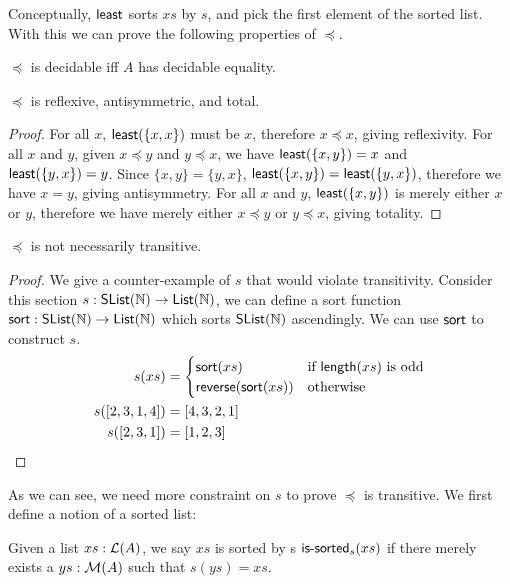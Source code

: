 Conceptually, $\operatorname{\mathsf{least}}$ sorts $xs$ by $s$, and pick the first element of the sorted list.
With this we can prove the following properties of $\preccurlyeq$.

\begin{proposition}
    $\preccurlyeq$ is decidable iff $A$ has decidable equality.
\end{proposition}

\begin{proposition}
$\preccurlyeq$ is reflexive, antisymmetric, and total.
\end{proposition}
\begin{proof}
For all $x$, $\operatorname{\mathsf{least}}(\{x, x\})$ must be $x$, therefore $x \preccurlyeq x$, giving reflexivity.
For all $x$ and $y$, given $x \preccurlyeq y$ and $y \preccurlyeq x$,
we have $\operatorname{\mathsf{least}}(\{x, y\}) = x$ and $\operatorname{\mathsf{least}}(\{y, x\}) = y$.
Since $\{x, y\} = \{y, x\}$, $\operatorname{\mathsf{least}}(\{x, y\}) = \operatorname{\mathsf{least}}(\{y, x\})$,
therefore we have $x = y$, giving antisymmetry.
For all $x$ and $y$, $\operatorname{\mathsf{least}}(\{x, y\})$ is merely either $x$ or $y$,
therefore we have merely either $x \preccurlyeq y$ or $y \preccurlyeq x$, giving totality.
\end{proof}

\begin{proposition}
$\preccurlyeq$ is not necessarily transitive.
\end{proposition}
\begin{proof}
We give a counter-example of $s$ that would violate transitivity.
Consider this section $s : \operatorname{\mathsf{SList}}(\mathbb{N}) \to \operatorname{\mathsf{List}}(\mathbb{N})$, we can define a sort function
$\operatorname{\mathsf{sort}} : \operatorname{\mathsf{SList}}(\mathbb{N}) \to \operatorname{\mathsf{List}}(\mathbb{N})$ which sorts $\operatorname{\mathsf{SList}}(\mathbb{N})$ ascendingly. We can use $\operatorname{\mathsf{sort}}$
to construct $s$.
\begin{align*}
    s(xs) &= \begin{cases}
        \operatorname{\mathsf{sort}}(xs) & \text{if $\operatorname{\mathsf{length}}(xs)$ is odd} \\        
        \operatorname{\mathsf{reverse}}(\operatorname{\mathsf{sort}}(xs)) & \text{otherwise}
    \end{cases}\\
    s([2,3,1,4]) &= [4,3,2,1]\\
    s([2,3,1]) &= [1,2,3]
\end{align*}
\end{proof}

As we can see, we need more constraint on $s$ to prove $\preccurlyeq$ is transitive.
We first define a notion of a sorted list:
\begin{definition}
    Given a list $xs : \mathcal{L}(A)$, we say $xs$ is sorted by s $\operatorname{\mathsf{is-sorted}}_s(xs)$ if there merely exists
    a $ys : \mathcal{M}(A)$ such that $s(ys) = xs$.
\end{definition}

